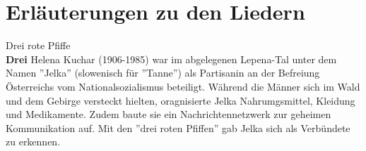 \section*{Erläuterungen zu den Liedern}

Drei rote Pfiffe \\
 \textbf{Drei}
Helena Kuchar (1906-1985) war im abgelegenen Lepena-Tal unter dem Namen ''Jelka'' (slowenisch für ''Tanne'') als Partisanin an der Befreiung Österreichs vom Nationalsozialismus beteiligt.
Während die Männer sich im Wald und dem Gebirge versteckt hielten, oragnisierte Jelka Nahrumgsmittel, Kleidung und Medikamente.
Zudem baute sie ein Nachrichtennetzwerk zur geheimen Kommunikation auf. Mit den ''drei roten Pfiffen'' gab Jelka sich als Verbündete zu erkennen.


